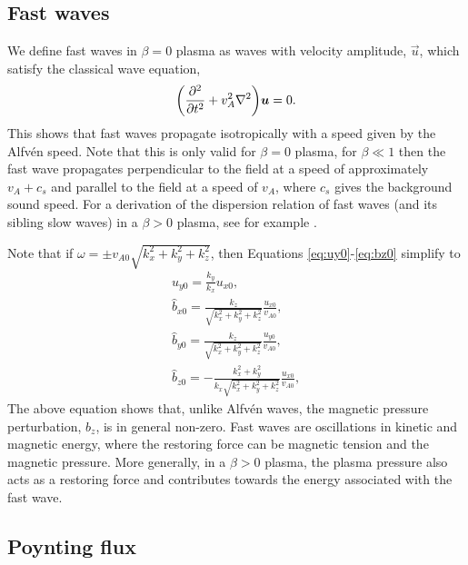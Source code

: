 \subsection{Fast waves}

We define fast waves in $\beta=0$ plasma as waves with velocity amplitude, $\vec{u}$, which satisfy the classical wave equation,
\begin{equation}
    \qty(\pdv[2]{}{t}+v_A^2\laplacian)\vec{u}=0.
\end{equation}
This shows that fast waves propagate isotropically with a speed given by the Alfv\'en speed.
Note that this is only valid for $\beta=0$ plasma, for $\beta\ll 1$ then the fast wave propagates perpendicular to the field at a speed of approximately $v_A + c_s$ and parallel to the field at a speed of $v_A$, where $c_s$ gives the background sound speed. For a derivation of the dispersion relation of fast waves (and its sibling slow waves) in a $\beta>0$ plasma, see for example \citet{Priest2014, Roberts2019}.
 

Note that if $\omega=\pm v_{A0}\sqrt{k_x^2 + k_y^2 + k_z^2}$, then Equations \eqref{eq:uy0}-\eqref{eq:bz0} simplify to
\begin{gather}
    \label{eq:uy0_fast}
    u_{y0}=\frac{k_y}{k_x}u_{x0}, \\
    \label{eq:bx0_fast}
    \hat{b}_{x0} = \frac{k_z}{\sqrt{k_x^2 + k_y^2 + k_z^2}}\frac{u_{x0}}{v_{A0}}, \\
    \label{eq:by0_fast}
    \hat{b}_{y0} = \frac{k_z}{\sqrt{k_x^2 + k_y^2 + k_z^2}}\frac{u_{y0}}{v_{A0}}, \\
    \label{eq:bz0_fast}
    \hat{b}_{z0} = -\frac{k_x^2+k_y^2}{k_x\sqrt{k_x^2 + k_y^2 + k_z^2}}\frac{u_{x0}}{v_{A0}},
\end{gather}
The above equation shows that, unlike Alfv\'en waves, the magnetic pressure perturbation, $b_z$, is in general non-zero. Fast waves are oscillations in kinetic and magnetic energy, where the restoring force can be magnetic tension and the magnetic pressure. More generally, in a $\beta>0$ plasma, the plasma pressure also acts as a restoring force and contributes towards the energy associated with the fast wave.

\subsection{Poynting flux}

